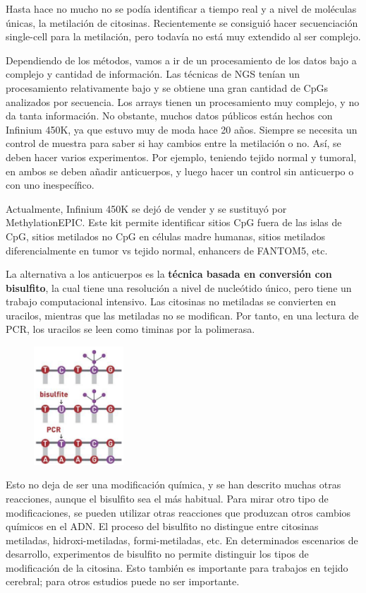 Hasta hace no mucho no se podía identificar a tiempo real y a nivel de moléculas únicas, la metilación de citosinas. Recientemente se consiguió hacer secuenciación single-cell para la metilación, pero todavía no está muy extendido al ser complejo. 

Dependiendo de los métodos, vamos a ir de un procesamiento de los datos bajo a complejo y cantidad de información. Las técnicas de NGS tenían un procesamiento relativamente bajo y se obtiene una gran cantidad de CpGs analizados por secuencia. Los arrays tienen un procesamiento muy complejo, y no da tanta información. No obstante, muchos datos públicos están hechos con Infinium 450K, ya que estuvo muy de moda hace 20 años. Siempre se necesita un control de muestra para saber si hay cambios entre la metilación o no. Así, se deben hacer varios experimentos. Por ejemplo, teniendo tejido normal y tumoral, en ambos se deben añadir anticuerpos, y luego hacer un control sin anticuerpo o con uno inespecífico. 

Actualmente, Infinium 450K se dejó de vender y se sustituyó por MethylationEPIC. Este kit permite identificar sitios CpG fuera de las islas de CpG, sitios metilados no CpG en células madre humanas, sitios metilados diferencialmente en tumor vs tejido normal, enhancers de FANTOM5, etc. 

La alternativa a los anticuerpos es la \textbf{técnica basada en conversión con bisulfito}, la cual tiene una resolución a nivel de nucleótido único, pero tiene un trabajo computacional intensivo. Las citosinas no metiladas se convierten en uracilos, mientras que las metiladas no se modifican. Por tanto, en una lectura de PCR, los uracilos se leen como timinas por la polimerasa. 

\begin{figure}[h]
\centering
\includegraphics[width = 0.3\textwidth]{figs/bisulphite.png}
\end{figure}

Esto no deja de ser una modificación química, y se han descrito muchas otras reacciones, aunque el bisulfito sea el más habitual. Para mirar otro tipo de modificaciones, se pueden utilizar otras reacciones que produzcan otros cambios químicos en el ADN. El proceso del bisulfito no distingue entre citosinas metiladas, hidroxi-metiladas, formi-metiladas, etc. En determinados escenarios de desarrollo, experimentos de bisulfito no permite distinguir los tipos de modificación de la citosina. Esto también es importante para trabajos en tejido cerebral; para otros estudios puede no ser importante.

